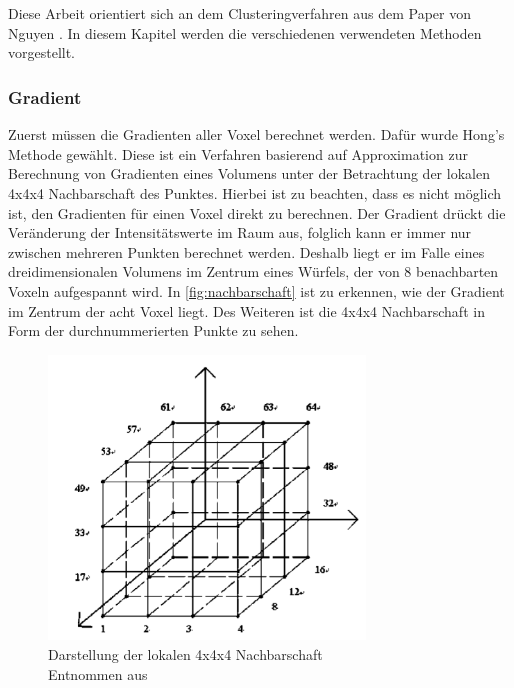 \chapter{}
\label{sec:methods}

Diese Arbeit orientiert sich an dem Clusteringverfahren aus dem Paper von Nguyen \cite{nguyen2012clustering}. In diesem Kapitel werden die verschiedenen verwendeten Methoden vorgestellt.

\subsection{Gradient}

Zuerst müssen die Gradienten aller Voxel berechnet werden. Dafür wurde Hong's Methode \cite{hong2003method} gewählt. Diese ist ein Verfahren basierend auf Approximation zur Berechnung von Gradienten eines Volumens unter der Betrachtung der lokalen 4x4x4 Nachbarschaft des Punktes.
\newline
Hierbei ist zu beachten, dass es nicht möglich ist, den Gradienten für einen Voxel direkt zu berechnen. Der Gradient drückt die Veränderung der Intensitätswerte im Raum aus, folglich kann er immer nur zwischen mehreren Punkten berechnet werden. Deshalb liegt er im Falle eines dreidimensionalen Volumens im Zentrum eines Würfels, der von 8 benachbarten Voxeln aufgespannt wird.
\newline
In \autoref{fig:nachbarschaft} ist zu erkennen, wie der Gradient im Zentrum der acht Voxel liegt. Des Weiteren ist die 4x4x4 Nachbarschaft in Form der durchnummerierten Punkte zu sehen.
\newline

\begin{figure}[!h] 
\centering 
\includegraphics[width=0.75\textwidth]{Logos/VoxelEdges.PNG}
\caption{Darstellung der lokalen 4x4x4 Nachbarschaft  \\ Entnommen aus \protect\cite{hong2003method}} 
\label{fig:nachbarschaft} 
\end{figure}


